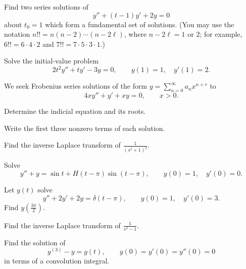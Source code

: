 \documentclass[11pt,oneside]{article}
\begin{document}
\begin{problem}
Find two series solutions of
\[
y''+(t-1)y'+2y=0
\]
about $t_0=1$ which form a fundamental set of solutions. (You may use the notation $n!!=n(n-2)\cdots(n-2\ell)$, where $n-2\ell=1$ or $2$; for example, $6!!=6\cdot4\cdot2$ and $7!!=7\cdot5\cdot3\cdot1$.)
\end{problem}

\begin{problem}
Solve the initial-value problem
\[
2t^2y''+ty'-3y=0,\qquad y(1)=1,\quad y'(1)=2.
\]
\end{problem}

\begin{problem}
We seek Frobenius series solutions of the form $\displaystyle y=\sum_{n=0}^{\infty}a_nx^{n+r}$ to
\[
4xy''+y'+xy=0,\qquad x>0.
\]
\begin{problemsubparts}
\item Determine the indicial equation and its roots.
\item Write the first three nonzero terms of each solution.
\end{problemsubparts}
\end{problem}

\begin{problem}
\begin{problemsubparts}
\item Find the inverse Laplace transform of $\displaystyle\frac{1}{(s^2+1)^2}$.
\item Solve
\[
y''+y=\sin t+H(t-\pi)\sin(t-\pi),\qquad y(0)=1,\quad y'(0)=0.
\]
\end{problemsubparts}
\end{problem}

\begin{problem}
Let $y(t)$ solve
\[
y''+2y'+2y=\delta(t-\pi),\qquad y(0)=1,\quad y'(0)=3.
\]
Find $\displaystyle y\left(\frac{3\pi}{2}\right)$.
\end{problem}

\begin{problem}
\begin{problemsubparts}
\item Find the inverse Laplace transform of $\displaystyle\frac{1}{s^3-1}$.
\item Find the solution of
\[
y^{(3)}-y=g(t),\qquad y(0)=y'(0)=y''(0)=0
\]
in terms of a convolution integral.
\end{problemsubparts}
\end{problem}
\end{document}
